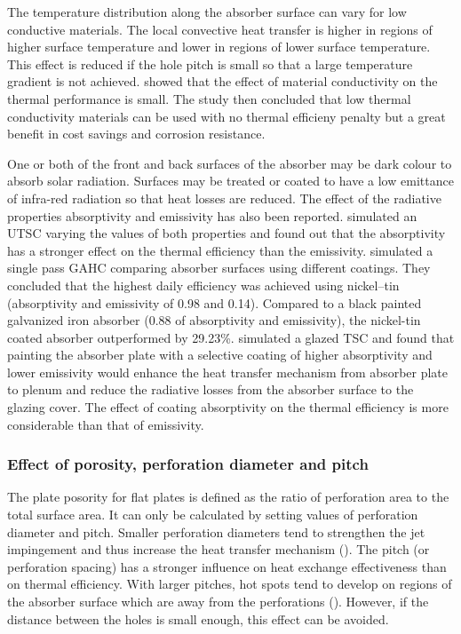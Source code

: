 The temperature distribution along the absorber surface can vary for low conductive materials. The local convective heat transfer is higher in regions of higher surface temperature and lower in regions of lower surface temperature. This effect is reduced if the hole pitch is small so that a large temperature gradient is not achieved. \citet{Gawlik2005} showed that the effect of material conductivity on the thermal performance is small. The study then concluded that low thermal conductivity materials can be used with no thermal efficieny penalty but a great benefit in cost savings and corrosion resistance.

One or both of the front and back surfaces of the absorber may be dark colour to absorb solar radiation. Surfaces may be treated or coated to have a low emittance of infra-red radiation so that heat losses are reduced. The effect of the radiative properties absorptivity and emissivity has also been reported. \citet{Leon2007} simulated an UTSC varying the values of both properties and found out that the absorptivity has a stronger effect on the thermal efficiency than the emissivity. \citet{El-Sebaii2010} simulated a single pass GAHC comparing absorber surfaces using different coatings. They concluded that the highest daily efficiency was achieved using nickel–tin (absorptivity and emissivity of 0.98 and 0.14). Compared to a black painted galvanized iron absorber (0.88 of absorptivity and emissivity), the nickel-tin coated absorber outperformed by 29.23\%. \citet{Li2016} simulated a glazed TSC and found that painting the absorber plate with a selective coating of higher absorptivity and lower emissivity would enhance the heat transfer mechanism from absorber plate to plenum and reduce the radiative losses from the absorber surface to the glazing cover. The effect of coating absorptivity on the thermal efficiency is more considerable than that of emissivity.

\subsubsection{Effect of porosity, perforation diameter and pitch} 

The plate posority for flat plates is defined as the ratio of perforation area to the total surface area. It can only be calculated by setting values of perforation diameter and pitch. Smaller perforation diameters tend to strengthen the jet impingement and thus increase the heat transfer mechanism (\citet{Li2016}). The pitch (or perforation spacing) has a stronger influence on heat exchange effectiveness than on thermal efficiency. With larger pitches, hot spots tend to develop on regions of the absorber surface which are away from the perforations (\citet{Arulanandam1999}). However, if the distance between the holes is small enough, this effect can be avoided. 

